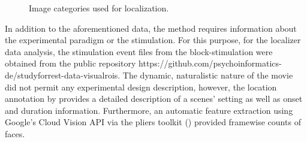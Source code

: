 \documentclass[a4paper, 12pt]{scrreprt}
\begin{document}
\begin{figure}[H]
	\caption{\small{Image categories used for localization.}}
	\label{fig:stims}
\end{figure} 

In addition to the aforementioned data, the method requires information about the experimental paradigm or the stimulation. For this purpose, for the localizer data analysis, the stimulation event files from the block-stimulation were obtained from the public repository https://github.com/psychoinformatics-de/studyforrest-data-visualrois. The dynamic, naturalistic nature of the movie did not permit any experimental design description, however, the location annotation by \textcite{hausler2016annotation} provides a detailed description of a scenes' setting as well as onset and duration information. Furthermore, an automatic feature extraction using Google's Cloud Vision API via the pliers toolkit (\cite{yarkonipliers}) provided framewise counts of faces. 
\end{document}
